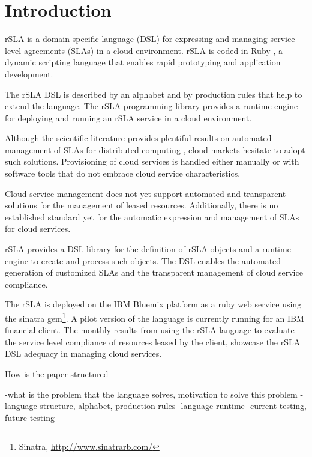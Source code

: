 \section{Introduction}\label{sec:introduction}

rSLA is a domain specific language (DSL) for expressing and managing service level agreements (SLAs) in a cloud environment. rSLA is coded in Ruby \cite{ruby}, a dynamic scripting language that enables rapid prototyping and application development. 

The rSLA DSL is described by an alphabet and by production rules that help to extend the language. The rSLA programming library provides a runtime engine for deploying and running an rSLA service in a cloud environment.

Although the scientific literature provides plentiful results on automated management of SLAs for distributed computing \cite{wsla, wsag, more}, cloud markets hesitate to adopt such solutions. Provisioning of cloud services is handled either manually or with software tools that do not embrace cloud service characteristics.

Cloud service management does not yet support automated and transparent solutions for the management of leased resources. Additionally, there is no established standard yet for the automatic expression and management of SLAs for cloud services.

rSLA provides a DSL library for the definition of rSLA objects and a runtime engine to create and process such objects. The DSL enables the automated generation of customized SLAs and the transparent management of cloud service compliance.

The rSLA is deployed on the IBM Bluemix platform \cite{bluemix} as a ruby web service using the sinatra gem\footnote{Sinatra, \url{http://www.sinatrarb.com/}}. A pilot version of the language is currently running for an IBM financial client. The monthly results from using the rSLA language to evaluate the service level compliance of resources leased by the client, showcase the rSLA DSL adequacy in managing cloud services.

How is the paper structured

-what is the problem that the language solves, motivation to solve this problem
-language structure, alphabet, production rules
-language runtime
-current testing, future testing